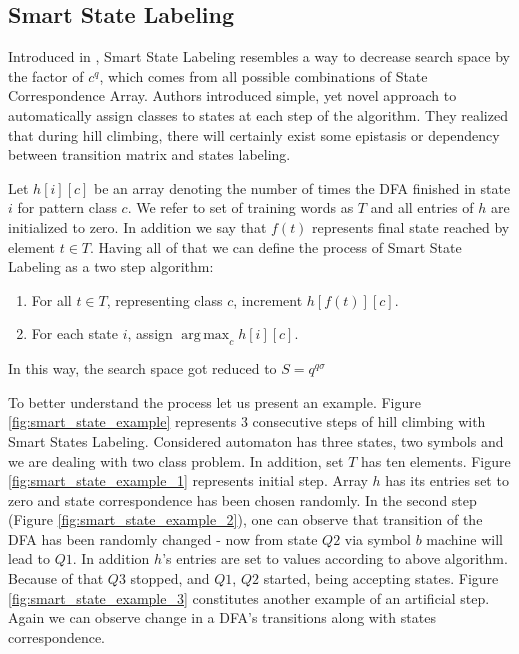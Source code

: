 \documentclass{mini}
\DeclareMathOperator*{\argmax}{arg\,max} %
\begin{document}
\subsection{Smart State Labeling} \label{subsec:smart_labeling}
Introduced in \cite{hc_4}, Smart State Labeling resembles a way to decrease search space by the factor of $c^{q}$, which comes from all possible combinations of State Correspondence Array. Authors introduced simple, yet novel approach to automatically assign classes to states at each step of the algorithm. They realized that during hill climbing, there will certainly exist some epistasis or dependency between transition matrix and states labeling.

Let $h[i][c]$ be an array denoting the number of times the DFA finished in state $i$ for pattern class $c$. We refer to set of training words as $T$ and all entries of $h$ are initialized to zero. In addition we say that $f(t)$ represents final state reached by element $t \in T$. Having all of that we can define the process of Smart State Labeling as a two step algorithm:
\begin{enumerate}
\item For all $t \in T$, representing class $c$, increment $h[f(t)][c]$.
\item For each state $i$, assign $\argmax_c h[i][c]$.
\end{enumerate}
In this way, the search space got reduced to $S = q^{q \sigma}$

To better understand the process let us present an example. Figure \ref{fig:smart_state_example} represents 3 consecutive steps of hill climbing with Smart States Labeling. Considered automaton has three states, two symbols and we are dealing with two class problem. In addition, set $T$ has ten elements. Figure \ref{fig:smart_state_example_1} represents initial step. Array $h$ has its entries set to zero and state correspondence has been chosen randomly. In the second step (Figure \ref{fig:smart_state_example_2}), one can observe that transition of the DFA has been randomly changed - now from state $Q2$ via symbol $b$ machine will lead to $Q1$. In addition $h$'s entries are set to values according to above algorithm. Because of that $Q3$ stopped, and $Q1$, $Q2$ started, being accepting states. Figure \ref{fig:smart_state_example_3} constitutes another example of an artificial step. Again we can observe change in a DFA's transitions along with states correspondence.
\end{document}
